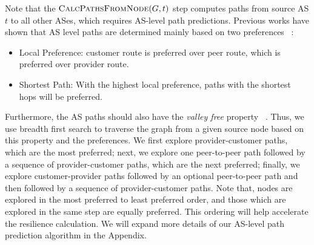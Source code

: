 Note that the $\Call{CalcPathsFromNode}{G,t}$ step computes paths from source AS $t$ to all other ASes, which requires AS-level path predictions. Previous works have shown that AS level paths are determined mainly based on two preferences ~\cite{gao2001stable}:

\begin{itemize}
\item Local Preference: customer route is preferred over peer route, which is preferred over provider route. 
\item Shortest Path: With the highest local preference, paths with the shortest hops will be preferred. 
\end{itemize}

Furthermore, the AS paths should also have the \emph{valley free} property ~\cite{gao2001inferring}. Thus, we use breadth first search to traverse the graph from a given source node based on this property and the preferences. We first explore provider-customer paths, which are the most preferred; next, we explore one peer-to-peer path followed by a sequence of provider-customer paths, which are the next preferred; finally, we explore customer-provider paths followed by an optional peer-to-peer path and then followed by a sequence of provider-customer paths. Note that, nodes are explored in the most preferred to least preferred order, and those which are explored in the same step are equally preferred. This ordering will help accelerate the resilience calculation. We will expand more details of our AS-level path prediction algorithm in the Appendix.



